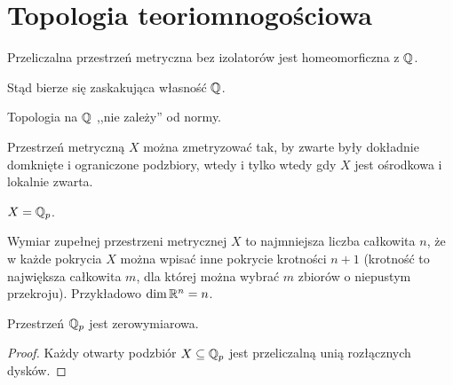 \section{Topologia teoriomnogościowa}
\begin{twierdzenie}[Sierpiński]
	Przeliczalna przestrzeń metryczna bez izolatorów jest homeomorficzna z $\mathbb Q$.
\end{twierdzenie}

Stąd bierze się zaskakująca własność $\mathbb Q$.

\begin{wniosek}
	Topologia na $\mathbb Q$ ,,nie zależy'' od normy.
\end{wniosek}

\begin{twierdzenie}[Vaughan, 1937]
	Przestrzeń metryczną $X$ można zmetryzować tak, by zwarte były dokładnie domknięte i ograniczone podzbiory, wtedy i tylko wtedy gdy $X$ jest ośrodkowa i lokalnie zwarta.
\end{twierdzenie}

\begin{przyklad}
	 $X = \mathbb Q_p$.
\end{przyklad}

Wymiar  zupełnej przestrzeni metrycznej $X$ to najmniejsza liczba całkowita $n$, że w każde pokrycia $X$ można wpisać inne pokrycie krotności $n + 1$ (krotność to największa całkowita $m$, dla której można wybrać $m$ zbiorów o niepustym przekroju).
Przykładowo $\dim \mathbb R^n = n$.

\begin{fakt}
	Przestrzeń $\mathbb Q_p$ jest zerowymiarowa.
\end{fakt}

\begin{proof}
	Każdy otwarty podzbiór $X \subseteq \mathbb Q_p$ jest przeliczalną unią rozłącznych dysków.
\end{proof}	

